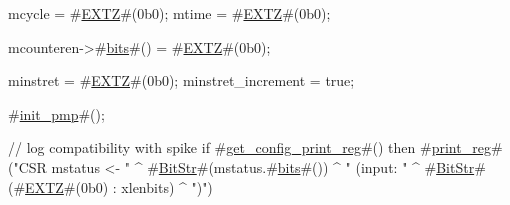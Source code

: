 {  mcycle          = #\hyperref[sailRISCVzEXTZ]{EXTZ}#(0b0);
  mtime           = #\hyperref[sailRISCVzEXTZ]{EXTZ}#(0b0);

  mcounteren->#\hyperref[sailRISCVzbits]{bits}#() = #\hyperref[sailRISCVzEXTZ]{EXTZ}#(0b0);

  minstret           = #\hyperref[sailRISCVzEXTZ]{EXTZ}#(0b0);
  minstret_increment = true;

  #\hyperref[sailRISCVzinitzypmp]{init\_pmp}#();

  // log compatibility with spike
  if   #\hyperref[sailRISCVzgetzyconfigzyprintzyreg]{get\_config\_print\_reg}#()
  then #\hyperref[sailRISCVzprintzyreg]{print\_reg}#("CSR mstatus <- " ^ #\hyperref[sailRISCVzBitStr]{BitStr}#(mstatus.#\hyperref[sailRISCVzbits]{bits}#()) ^ " (input: " ^ #\hyperref[sailRISCVzBitStr]{BitStr}#(#\hyperref[sailRISCVzEXTZ]{EXTZ}#(0b0) : xlenbits) ^ ")")
}
